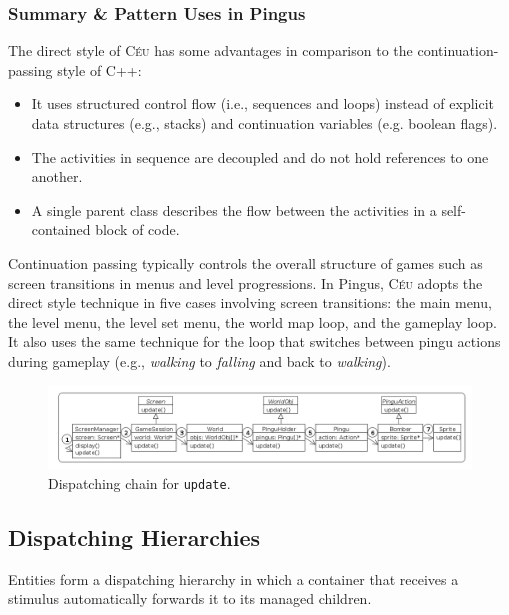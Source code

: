 \documentclass[10pt, conference, compsocconf]{IEEEtran}
\newcommand{\CEU}{\textsc{C\'{e}u}\xspace}
\newcommand{\code}[1] {{\small{\texttt{#1}}}}
\begin{document}
\subsubsection{Summary \& Pattern Uses in Pingus}

The direct style of \CEU has some advantages in comparison to the 
continuation-passing style of C++:
%
\begin{itemize}
\item It uses structured control flow (i.e., sequences and loops) instead of 
      explicit data structures (e.g., stacks) and continuation variables (e.g.
      boolean flags).
\item The activities in sequence are decoupled and do not hold references to
      one another. %
\item A single parent class describes the flow between the activities in a 
      self-contained block of code. %
\end{itemize}

Continuation passing typically controls the overall structure of games such as
screen transitions in menus and level progressions.
%
In Pingus, \CEU adopts the direct style technique in five cases involving
screen transitions:
the main menu, the level menu, the level set menu, the world map loop, and
the gameplay loop.
%
It also uses the same technique for the loop that switches between pingu
actions during gameplay (e.g., \emph{walking} to \emph{falling} and back to
\emph{walking}).

\begin{figure}
\centering
\includegraphics[width=\textwidth]{hierarchy}
\caption{Dispatching chain for \code{update}.
\label{fig.hier}
}
\end{figure}

\subsection{Dispatching Hierarchies}
\label{sec.pats.dispatching}

    Entities form a dispatching hierarchy in which a container that receives a
    stimulus automatically forwards it to its managed children.
\end{document}
